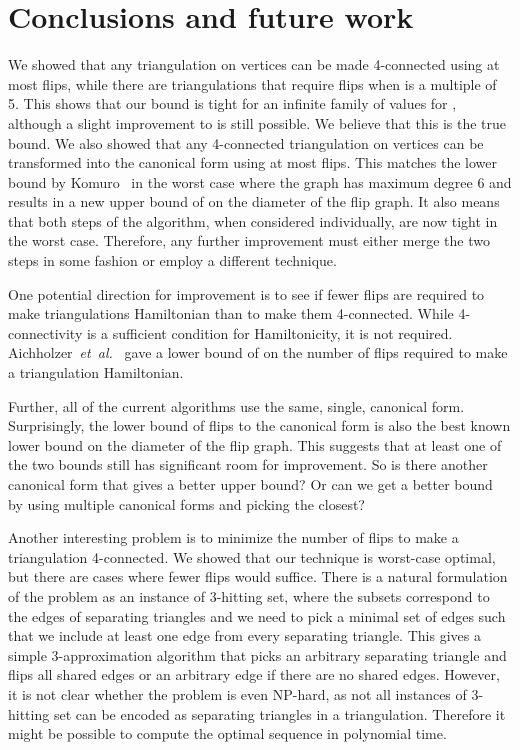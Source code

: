 \pdfoutput=1 \documentclass[12pt]{elsarticle}
\newcommand{\etal}{\emph{et~al.}\xspace}
\begin{document}
\section{Conclusions and future work}
\label{sec:conclusions}

\noindent We showed that any triangulation on  vertices can be made 4-connected using at most  flips, while there are triangulations that require  flips when  is a multiple of 5. This shows that our bound is tight for an infinite family of values for , although a slight improvement to  is still possible. We believe that this is the true bound. We also showed that any 4-connected triangulation on  vertices can be transformed into the canonical form using at most  flips. This matches the lower bound by Komuro~\cite{komuro1997diagonal} in the worst case where the graph has maximum degree 6 and results in a new upper bound of  on the diameter of the flip graph. It also means that both steps of the algorithm, when considered individually, are now tight in the worst case. Therefore, any further improvement must either merge the two steps in some fashion or employ a different technique.

One potential direction for improvement is to see if fewer flips are required to make triangulations Hamiltonian than to make them 4-connected. While 4-connectivity is a sufficient condition for Hamiltonicity, it is not required. Aichholzer~\etal~\cite{oswin08} gave a lower bound of  on the number of flips required to make a triangulation Hamiltonian.

Further, all of the current algorithms use the same, single, canonical form. Surprisingly, the lower bound of  flips to the canonical form is also the best known lower bound on the diameter of the flip graph. This suggests that at least one of the two bounds still has significant room for improvement. So is there another canonical form that gives a better upper bound? Or can we get a better bound by using multiple canonical forms and picking the closest?

Another interesting problem is to minimize the number of flips to make a triangulation 4-connected. We showed that our technique is worst-case optimal, but there are cases where fewer flips would suffice. There is a natural formulation of the problem as an instance of 3-hitting set, where the subsets correspond to the edges of separating triangles and we need to pick a minimal set of edges such that we include at least one edge from every separating triangle. This gives a simple 3-approximation algorithm that picks an arbitrary separating triangle and flips all shared edges or an arbitrary edge if there are no shared edges. However, it is not clear whether the problem is even NP-hard, as not all instances of 3-hitting set can be encoded as separating triangles in a triangulation. Therefore it might be possible to compute the optimal sequence in polynomial time.











\end{document}
